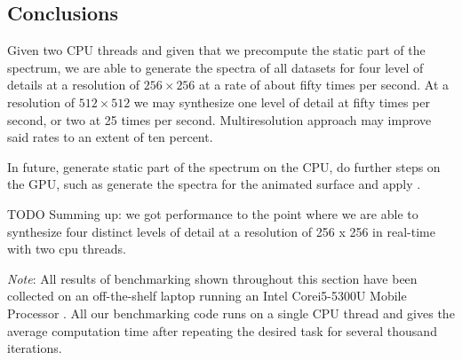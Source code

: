 \subsection{Conclusions}
Given two CPU threads and given that we precompute the static part of the spectrum,
we are able to generate the spectra of all datasets for four level of details at a
resolution of $256\times256$ at a rate of about fifty times per second.
At a resolution of $512\times512$ we may synthesize one level of detail at fifty
times per second, or two at 25 times per second. Multiresolution approach may improve
said rates to an extent of ten percent.

In future, generate static part of the spectrum on the CPU, do further steps on the
GPU, such as generate the spectra for the animated surface and apply \InvDiscreteFourierTransform. 

TODO Summing up: we got performance to the point where we are able to synthesize four
distinct levels of detail at a resolution of 256 x 256 in real-time with two
cpu threads. 


\emph{Note}: All results of benchmarking shown throughout this section
have been collected on an off-the-shelf laptop running an Intel\textregistered
Core\texttrademark i5-5300U Mobile Processor \citep{intel:5300u}.
All our benchmarking code runs on a single CPU thread and gives the average
computation time after repeating the desired task for several thousand iterations.
%
